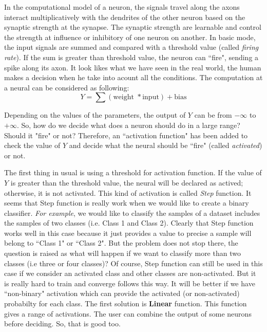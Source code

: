 In the computational model of a neuron, the signals travel along the axons interact multiplicatively with the dendrites of the other neuron based on the synaptic strength at the synapse. The synaptic strength are learnable and control the strength at influence or inhibitory of one neuron on another. In basic mode, the input signals are summed and compared with a threshold value (called \textit{firing rate}). If the sum is greater than threshold value, the neuron can ``fire", sending a spike along its axon. It look likes what we have seen in the real world, the human makes a decision when he take into acount all the conditions. The computation at a neural can be considered as following:
\begin{equation}
	Y = \sum(\text{weight } \ast \text{input}) + \text{bias}
\end{equation}

Depending on the values of the parameters, the output of \textbf{$Y$} can be from $-\infty$ to $+\infty$. So, how do we decide what does a neuron should do in a large range? Should it "fire" or not? Therefore, an ``activation function" has been added to check the value of $Y$ and decide what the neural should be ``fire" (called \textit{activated}) or not.

The first thing in usual is using a threshold for activation function. If the value of $Y$ is greater than the threshold value, the neural will be declared as actived; otherwise, it is not activated. This kind of activation is called \textit{Step} function. It seems that Step function is really work when we would like to create a binary classifier. \textit{For example}, we would like to classify the samples of a dataset includes the samples of two classes (i.e. Class 1 and Class 2). Clearly that Step function works well in this case because it just provides a value to precise a sample will belong to ``Class 1" or ``Class 2". But the problem does not stop there, the question is raised as what will happen if we want to classify more than two classes (i.e three or four classes)? Of course, Step function can still be used in this case if we consider an activated class and other classes are non-activated. But it is really hard to train and converge follows this way. It will be better if we have ``non-binary" activation which can provide the activated (or non-activated) probabilty for each class. The first solution is \textbf{Linear} function. This function gives a range of activations. The user can combine the output of some neurons before deciding. So, that is good too.

